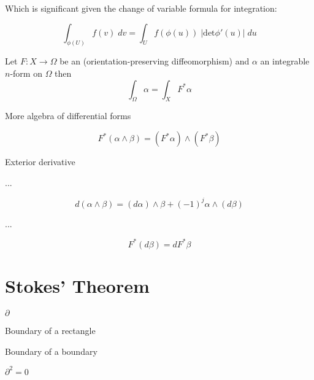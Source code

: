 Which is significant given the change of variable formula for integration:

\begin{equation}
\int_{\phi(U)} \! f(v) \; dv = \int_U \! f(\phi(u)) \; |\text{det}\phi'(u)| \; du
\end{equation}

\begin{theorem}
Let $F : X  \to \Omega$ be an (orientation-preserving diffeomorphism) and $\alpha$ an integrable $n$-form on $\Omega$ then
\begin{equation}
\int_\Omega \alpha = \int_X F^* \alpha
\end{equation}
\end{theorem}

More algebra of differential forms

\begin{equation}
F^* (\alpha \wedge \beta ) = (F^* \alpha) \wedge (F^* \beta)
\end{equation}

\begin{definition}
Exterior derivative
\end{definition}

...

\begin{equation}
d(\alpha \wedge \beta) = (d \alpha) \wedge \beta + (-1)^j \alpha \wedge ( d \beta)
\end{equation}

...

\begin{equation}
F^* (d \beta ) = dF^* \beta
\end{equation}




\section{Stokes' Theorem}

\begin{definition}
$\partial$
\end{definition}

\begin{example}
Boundary of a rectangle
\end{example}

\begin{example}
Boundary of a boundary
\end{example}

\begin{theorem}
$\partial^2 = 0$
\end{theorem}

